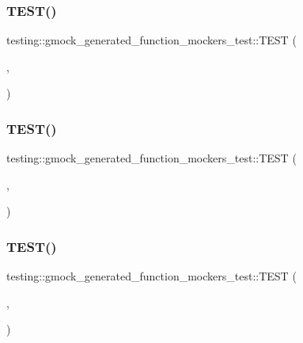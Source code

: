 \subsubsection{\texorpdfstring{TEST()}{TEST()}\hspace{0.1cm}{\footnotesize\ttfamily [3/14]}}
{\footnotesize\ttfamily testing\+::gmock\+\_\+generated\+\_\+function\+\_\+mockers\+\_\+test\+::\+T\+E\+ST (\begin{DoxyParamCaption}\item[{Template\+Mock\+Test}]{,  }\item[{Method\+With\+Comma\+In\+Return\+Type\+Works}]{ }\end{DoxyParamCaption})}

\mbox{\label{namespacetesting_1_1gmock__generated__function__mockers__test_a6542d3ae3f153907c32f3cf15a2ff6cf}} 
\subsubsection{\texorpdfstring{TEST()}{TEST()}\hspace{0.1cm}{\footnotesize\ttfamily [4/14]}}
{\footnotesize\ttfamily testing\+::gmock\+\_\+generated\+\_\+function\+\_\+mockers\+\_\+test\+::\+T\+E\+ST (\begin{DoxyParamCaption}\item[{Overloaded\+Mock\+Method\+Test}]{,  }\item[{Can\+Overload\+On\+Arg\+Number\+In\+Macro\+Body}]{ }\end{DoxyParamCaption})}

\mbox{\label{namespacetesting_1_1gmock__generated__function__mockers__test_aa58ec93a77bee21244c10da2bc8cf70e}} 
\subsubsection{\texorpdfstring{TEST()}{TEST()}\hspace{0.1cm}{\footnotesize\ttfamily [5/14]}}
{\footnotesize\ttfamily testing\+::gmock\+\_\+generated\+\_\+function\+\_\+mockers\+\_\+test\+::\+T\+E\+ST (\begin{DoxyParamCaption}\item[{Overloaded\+Mock\+Method\+Test}]{,  }\item[{Can\+Overload\+On\+Constness\+In\+Macro\+Body}]{ }\end{DoxyParamCaption})}

